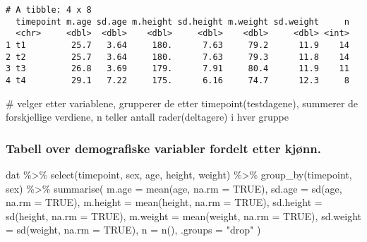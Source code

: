 \documentclass[
  letterpaper,
  DIV=11,
  numbers=noendperiod]{scrreprt}
\newenvironment{Shaded}{\begin{snugshade}}{\end{snugshade}}
\newcommand{\AttributeTok}[1]{\textcolor[rgb]{0.40,0.45,0.13}{#1}}
\newcommand{\CommentTok}[1]{\textcolor[rgb]{0.37,0.37,0.37}{#1}}
\newcommand{\ConstantTok}[1]{\textcolor[rgb]{0.56,0.35,0.01}{#1}}
\newcommand{\FunctionTok}[1]{\textcolor[rgb]{0.28,0.35,0.67}{#1}}
\newcommand{\NormalTok}[1]{\textcolor[rgb]{0.00,0.23,0.31}{#1}}
\newcommand{\SpecialCharTok}[1]{\textcolor[rgb]{0.37,0.37,0.37}{#1}}
\newcommand{\StringTok}[1]{\textcolor[rgb]{0.13,0.47,0.30}{#1}}
\begin{document}
\begin{verbatim}
# A tibble: 4 x 8
  timepoint m.age sd.age m.height sd.height m.weight sd.weight     n
  <chr>     <dbl>  <dbl>    <dbl>     <dbl>    <dbl>     <dbl> <int>
1 t1         25.7   3.64     180.      7.63     79.2      11.9    14
2 t2         25.7   3.64     180.      7.63     79.3      11.8    14
3 t3         26.8   3.69     179.      7.91     80.4      11.9    11
4 t4         29.1   7.22     175.      6.16     74.7      12.3     8
\end{verbatim}

\begin{Shaded}
\begin{Highlighting}[]
\CommentTok{\# velger etter variablene, grupperer de etter timepoint(testdagene), summerer de forskjellige verdiene, n teller antall rader(deltagere) i hver gruppe }
\end{Highlighting}
\end{Shaded}

\subsubsection{Tabell over demografiske variabler fordelt etter
kjønn.}\label{tabell-over-demografiske-variabler-fordelt-etter-kjuxf8nn.}

\begin{Shaded}
\begin{Highlighting}[]
\NormalTok{dat }\SpecialCharTok{\%\textgreater{}\%}
  \FunctionTok{select}\NormalTok{(timepoint, sex, age, height, weight) }\SpecialCharTok{\%\textgreater{}\%}
  \FunctionTok{group\_by}\NormalTok{(timepoint, sex) }\SpecialCharTok{\%\textgreater{}\%}
  \FunctionTok{summarise}\NormalTok{(}
    \AttributeTok{m.age =} \FunctionTok{mean}\NormalTok{(age, }\AttributeTok{na.rm =} \ConstantTok{TRUE}\NormalTok{),}
    \AttributeTok{sd.age =} \FunctionTok{sd}\NormalTok{(age, }\AttributeTok{na.rm =} \ConstantTok{TRUE}\NormalTok{),}
    \AttributeTok{m.height =} \FunctionTok{mean}\NormalTok{(height, }\AttributeTok{na.rm =} \ConstantTok{TRUE}\NormalTok{),}
    \AttributeTok{sd.height =} \FunctionTok{sd}\NormalTok{(height, }\AttributeTok{na.rm =} \ConstantTok{TRUE}\NormalTok{),}
    \AttributeTok{m.weight =} \FunctionTok{mean}\NormalTok{(weight, }\AttributeTok{na.rm =} \ConstantTok{TRUE}\NormalTok{),}
    \AttributeTok{sd.weight =} \FunctionTok{sd}\NormalTok{(weight, }\AttributeTok{na.rm =} \ConstantTok{TRUE}\NormalTok{),}
    \AttributeTok{n =} \FunctionTok{n}\NormalTok{(),}
    \AttributeTok{.groups =} \StringTok{"drop"}
\NormalTok{  )}
\end{Highlighting}
\end{Shaded}
\end{document}
